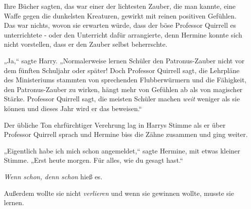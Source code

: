Ihre Bücher sagten, das war einer der lichtesten Zauber, die man kannte, eine Waffe gegen die dunkelsten Kreaturen, gewirkt mit reinen positiven Gefühlen. Das war nichts, wovon sie erwarten würde, dass der böse Professor Quirrell es unterrichtete - oder den Unterricht dafür arrangierte, denn Hermine konnte sich nicht vorstellen, dass er den Zauber selbst beherrschte.

„Ja,“ sagte Harry. „Normalerweise lernen Schüler den Patronus-Zauber nicht vor dem fünften Schuljahr oder später! Doch Professor Quirrell sagt, die Lehrpläne des Ministeriums stammten von sprechenden Flubberwürmern und die Fähigkeit, den Patronus-Zauber zu wirken, hängt mehr von Gefühlen ab als von magischer Stärke. Professor Quirrell sagt, die meisten Schüler machen \emph{weit} weniger als sie können und dieses Jahr wird er das beweisen.“

Der übliche Ton ehrfürchtiger Verehrung lag in Harrys Stimme als er über Professor Quirrell sprach und Hermine biss die Zähne zusammen und ging weiter.

„Eigentlich habe ich mich schon angemeldet,“ sagte Hermine, mit etwas kleiner Stimme. „Erst heute morgen. Für alles, wie du gesagt hast.“

\emph{Wenn schon, denn schon} hieß es.

Außerdem wollte sie nicht \emph{verlieren} und wenn sie gewinnen wollte, musste sie lernen.

